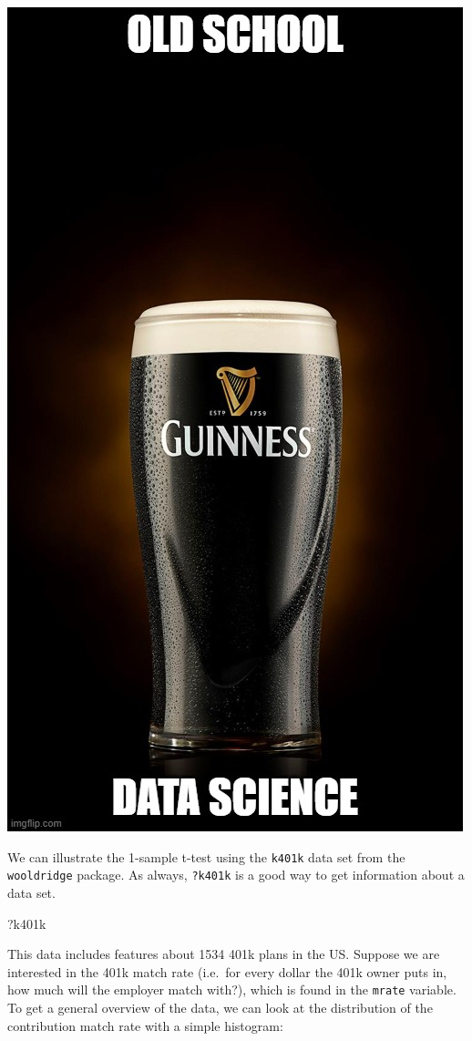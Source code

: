 \documentclass[
  letterpaper,
]{book}
\newenvironment{Shaded}{\begin{snugshade}}{\end{snugshade}}
\newcommand{\NormalTok}[1]{\textcolor[rgb]{0.00,0.23,0.31}{#1}}
\begin{document}
\begin{center}
\includegraphics[width=0.5\linewidth,height=\textheight,keepaspectratio]{images/guinness.jpg}
\end{center}

We can illustrate the 1-sample t-test using the \texttt{k401k} data set
from the \texttt{wooldridge} package. As always, \texttt{?k401k} is a
good way to get information about a data set.

\begin{Shaded}
\begin{Highlighting}[]
\NormalTok{?k401k}
\end{Highlighting}
\end{Shaded}

This data includes features about 1534 401k plans in the US. Suppose we
are interested in the 401k match rate (i.e.~for every dollar the 401k
owner puts in, how much will the employer match with?), which is found
in the \texttt{mrate} variable. To get a general overview of the data,
we can look at the distribution of the contribution match rate with a
simple histogram:
\end{document}
